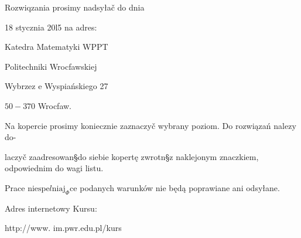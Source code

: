 \documentclass[a4paper,12pt]{article}
\begin{document}
Rozwiqzania prosimy nadsyłač do dnia

18 stycznia 20l5 na adres:

Katedra Matematyki WPPT

Politechniki Wrocfawskiej

Wybrzez $\mathrm{e}$ Wyspiańskiego 27

$50-370$ Wrocfaw.

Na kopercie prosimy koniecznie zaznaczyč wybrany poziom. Do rozwiązań nalez$\mathrm{y}$ do-

laczyč zaadresowan\S do siebie kopertę zwrotn\S z naklejonym znaczkiem, odpowiednim do wagi listu.

Prace $\mathrm{n}\mathrm{i}\mathrm{e}\mathrm{s}\mathrm{p}\mathrm{e}l\mathrm{n}\mathrm{i}\mathrm{a}\mathrm{j}_{\Phi}\mathrm{c}\mathrm{e}$ podanych warunków nie będą poprawiane ani odsyłane.

Adres internetowy Kursu:

http://www. im.pwr.edu.pl/kurs
\end{document}
